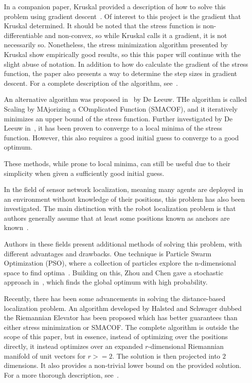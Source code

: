In a companion paper, Kruskal provided a description of how to solve this problem using gradient descent~\cite{kruskal1964implementation}. Of interest to this project is the gradient that Kruskal determined. It should be noted that the stress function is non-differentiable and non-convex, so while Kruskal calls it a gradient, it is not necessarily so. Nonetheless, the stress minimization algorithm presented by Kruskal show empirically good results, so this this paper will continue with the slight abuse of notation. In addition to how do calculate the gradient of the stress function, the paper also presents a way to determine the step sizes in gradient descent. For a complete description of the algorithm, see~\cite{kruskal1964implementation}.

An alternative algorithm was proposed in~\cite{MDS_proposal} by De Leeuw. THe algorithm is called Scaling by MAjorizing a COmplicated Function (SMACOF), and it iteratively minimizes an upper bound of the stress function. Further investigated by De Leeuw in~\cite{SMACOF_convergence}, it has been proven to converge to a local minima of the stress function. However, this also requires a good initial guess to converge to a good optimum. 

These methods, while prone to local minima, can still be useful due to their simplicity when given a sufficiently good initial guess. 

In the field of sensor network localization, meaning many agents are deployed in an environment without knowledge of their positions, this problem has also been investigated. The main distinction with the robot localization problem is that authors generally assume that at least some positions known as anchors are known~\cite{WSN_collaborative,WSN_localization_techniques,optimization_WSN,WSN_stochastic}. 

Authors in these fields present additional methods of solving this problem, with different advantages and drawbacks. One technique is Particle Swarm Optimization (PSO), where a collection of particles explore the n-dimensional space to find optima~\cite{WSN_particles}. Building on this, Zhou and Chen gave a stochastic approach in~\cite{WSN_stochastic}, which finds the global optimum with high probability. 

Recently, there has been some advancements in solving the distance-based localization problem. An algorithm developed by Halsted and Schwager dubbed the Riemannian Elevator has been proposed which has better guarantees than either stress minimization or SMACOF. The complete algorithm is outside the scope of this paper, but in essence, instead of optimizing over the positions directly, it instead optimizes over an expanded $r$-dimensional Riemannian manifold of unit vectors for $r >= 2$. The solution is then projected into $2$ dimensions. It also provides a non-trivial lower bound on the provided solution. For a more thorough description, see~\cite{R_elevator}. 
